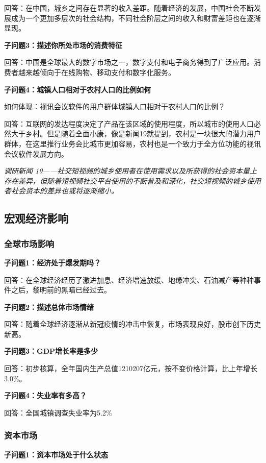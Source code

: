 \documentclass[a4paper,12pt]{article}
\begin{document}
    回答：在中国，城乡之间存在显著的收入差距。随着经济的发展，中国社会不断发展成为一个更加多层次的社会结构，不同社会阶层之间的收入和财富差距也在逐渐显现。

    \textbf{子问题3：描述你所处市场的消费特征}

    回答：中国是全球最大的数字市场之一，数字支付和电子商务得到了广泛应用。消费者越来越倾向于在线购物、移动支付和数字化服务。

    \textbf{子问题4：城镇人口相对于农村人口的比例如何}

    如何体现：视讯会议软件的⽤户群体城镇⼈⼝相对于农村⼈⼝的⽐例？

    回答：互联⽹的发达程度决定了产品在该区域的使⽤程度，所以城市的使⽤⼈⼝必然⼤于乡村。但是随着全⾯⼩康，像是新闻19就提到，农村是⼀块很⼤的潜⼒⽤户群体，在这⾥推⾏业务会⽐城市更加容易，农村也是⼀个致⼒于全⽅位功能的视讯会议软件发展⽅向。

    \textit{调研新闻 19——社交短视频的城乡使⽤者在使⽤需求以及所获得的社会资本量上存在差异，但随着短视频社交平台使⽤的不断普及和深化，社交短视频的城乡使⽤者社会资本的差异也或将逐渐缩⼩。}

    \textit{}

    \subsection{宏观经济影响}
    \subsubsection{全球市场影响}
    \textbf{子问题1：经济处于爆发期吗？}

    回答：在全球经济经历了激进加息、经济增速放缓、地缘冲突、石油减产等种种事件之后，黎明前的黑暗已经过去。

    \textbf{子问题2：描述总体市场情绪}

    回答：随着全球经济逐渐从新冠疫情的冲击中恢复，市场表现良好，股市创下历史新高。

    \textbf{子问题3：GDP增长率是多少}

    回答：初步核算，全年国内生产总值1210207亿元，按不变价格计算，比上年增长3.0\%。

    \textbf{子问题4：失业率有多高？}

    回答：全国城镇调查失业率为5.2\%

    \subsubsection{资本市场}
    \textbf{子问题1：资本市场处于什么状态}
\end{document}
